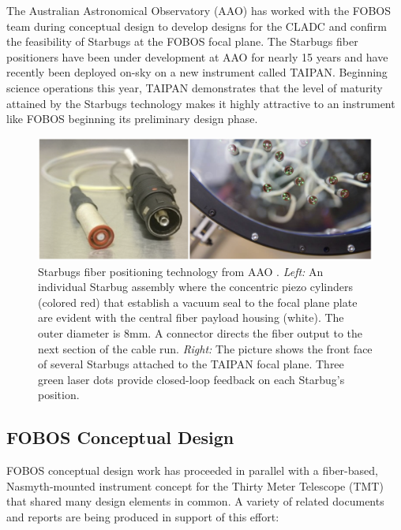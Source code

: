 \documentclass[oneside,11pt]{amsart}
\begin{document}
The Australian Astronomical Observatory (AAO) has worked with the FOBOS
team during conceptual design to develop designs for the CLADC and
confirm the feasibility of Starbugs at the FOBOS focal plane.  The
Starbugs fiber positioners have been under development at AAO for nearly
15 years \citep[see][]{staszak16} and have recently been deployed on-sky
on a new instrument called TAIPAN.  Beginning science operations this
year, TAIPAN demonstrates that the level of maturity attained by the
Starbugs technology makes it highly attractive to an instrument like
FOBOS beginning its preliminary design phase.

\begin{figure}[h!]
%
\vskip -0.1in
%
\includegraphics[width=\textwidth]{figs/starbugs.png}
%
\caption{\small Starbugs fiber positioning technology from AAO
\citep[from][]{staszak16}.  {\it Left:} An individual Starbug assembly
where the concentric piezo cylinders (colored red) that establish a
vacuum seal to the focal plane plate are evident with the central fiber
payload housing (white).  The outer diameter is 8mm.  A connector
directs the fiber output to the next section of the cable run. {\it
Right:} The picture shows the front face of several Starbugs attached to
the TAIPAN focal plane.  Three green laser dots provide closed-loop
feedback on each Starbug's position.}
%
\label{fig:starbugs}
%
\end{figure}


\subsection{FOBOS Conceptual Design}

FOBOS conceptual design work has proceeded in parallel with a
fiber-based, Nasmyth-mounted instrument concept for the Thirty Meter
Telescope (TMT) that shared many design elements in common.  A variety
of related documents and reports are being produced in support of this
effort:
\end{document}
